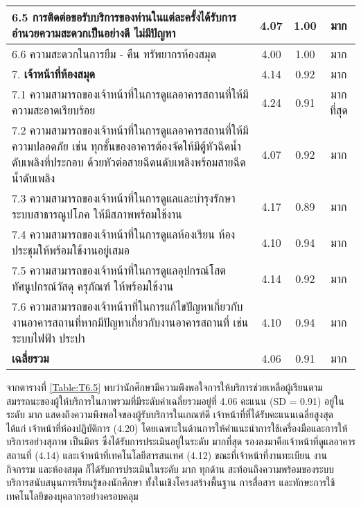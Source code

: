 \begin{longtable}{|>{\raggedright}p{9cm}|c|c|c|}
	6.5 การติดต่อขอรับบริการของท่านในแต่ละครั้งได้รับการอำนวยความสะดวกเป็นอย่างดี ไม่มีปัญหา & 4.07 & 1.00 & มาก\\\hline
	6.6 ความสะดวกในการยืม - คืน ทรัพยากรห้องสมุด & 4.00 & 1.00 & มาก\\\hline
	7. \textbf{เจ้าหน้าที่ห้องสมุด} & 4.14 & 0.92 &  มาก \\ \hline
	7.1 ความสามารถของเจ้าหน้าที่ในการดูแลอาคารสถานที่ให้มีความสะอาดเรียบร้อย & 4.24 & 0.91 & มากที่สุด\\\hline
	7.2 ความสามารถของเจ้าหน้าที่ในการดูแลอาคารสถานที่ให้มีความปลอดภัย เช่น ทุกชั้นของอาคารต้องจัดให้มีตู้หัวฉีดน้ำดับเพลิงที่ประกอบ ด้วยหัวต่อสายฉีดนดับเพลิงพร้อมสายฉีดน้ำดับเพลิง & 4.07 & 0.92 & มาก\\\hline
	7.3 ความสามารถของเจ้าหน้าที่ในการดูแลและบำรุงรักษาระบบสาธารณูปโภค ให้มีสภาพพร้อมใช้งาน & 4.17 & 0.89 & มาก\\\hline
	7.4 ความสามารถของเจ้าหน้าที่ในการดูแลห้องเรียน ห้องประชุมให้พร้อมใช้งานอยู่เสมอ & 4.10 & 0.94 & มาก\\\hline
	7.5 ความสามารถของเจ้าหน้าที่ในการดูแลอุปกรณ์โสตทัศนูปกรณ์วัสดุ ครุภัณฑ์ ให้พร้อมใช้งาน & 4.14 & 0.92 & มาก\\\hline
	7.6 ความสามารถของเจ้าหน้าาที่ในการแก้ไขปัญหาเกี่ยวกับงานอาคารสถานที่หากมีปัญหาเกี่ยวกับงานอาคารสถานที่ เช่น ระบบไฟฟ้า ประปา & 4.10 & 0.94 & มาก\\\hline
	\textbf{เฉลี่ยรวม}& 4.06 & 0.91 & มาก\\\hline
\end{longtable}

  
  จากตารางที่ \ref{Table:T6.5} พบว่านักศึกษามีความพึงพอใจการให้บริการช่วยเหลือผู้เรียนตามสมรรถนะของผู้ให้บริการในภาพรวมที่มีระดับค่าเฉลี่ยรวมอยู่ที่ 4.06 คะแนน (SD = 0.91) อยู่ในระดับ มาก แสดงถึงความพึงพอใจของผู้รับบริการในเกณฑ์ดี เจ้าหน้าที่ที่ได้รับคะแนนเฉลี่ยสูงสุด ได้แก่ เจ้าหน้าที่ห้องปฏิบัติการ (4.20) โดยเฉพาะในด้านการให้คำแนะนำการใช้เครื่องมือและการให้บริการอย่างสุภาพ เป็นมิตร ซึ่งได้รับการประเมินอยู่ในระดับ มากที่สุด รองลงมาคือเจ้าหน้าที่ดูแลอาคารสถานที่ (4.14) และเจ้าหน้าที่เทคโนโลยีสารสนเทศ (4.12) ขณะที่เจ้าหน้าที่งานทะเบียน งานกิจกรรม และห้องสมุด ก็ได้รับการประเมินในระดับ มาก ทุกด้าน สะท้อนถึงความพร้อมของระบบบริการสนับสนุนการเรียนรู้ของนักศึกษา ทั้งในเชิงโครงสร้างพื้นฐาน การสื่อสาร และทักษะการใช้เทคโนโลยีของบุคลากรอย่างครอบคลุม 
\begin{doclist}
\end{doclist}

